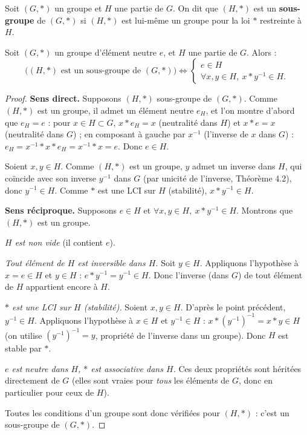 \documentclass[a4paper,12pt,openany]{book}
\begin{document}
\begin{definition}[4.4]
Soit $(G,*)$ un groupe et $H$ une partie de $G$. On dit que $(H,*)$ est un
\textbf{sous-groupe} de $(G,*)$ si $(H,*)$ est lui-même un groupe pour la
loi $*$ restreinte à $H$.
\end{definition}

\begin{theoreme}
Soit $(G,*)$ un groupe d'élément neutre $e$, et $H$ une partie de $G$.
Alors :
\[
\big((H,*) \text{ est un sous-groupe de } (G,*)\big) \iff
\begin{cases}
e \in H \\
\forall x,y \in H,\ x*y^{-1} \in H.
\end{cases}
\]
\end{theoreme}

\begin{proof}
\textbf{Sens direct.} Supposons $(H,*)$ sous-groupe de $(G,*)$. Comme
$(H,*)$ est un groupe, il admet un élément neutre $e_H$, et l'on montre
d'abord que $e_H=e$ : pour $x\in H\subset G$, $x*e_H=x$ (neutralité dans
$H$) et $x*e=x$ (neutralité dans $G$) ; en composant à gauche par
$x^{-1}$ (l'inverse de $x$ dans $G$) : $e_H = x^{-1}*x*e_H = x^{-1}*x =
e$. Donc $e\in H$.

Soient $x,y\in H$. Comme $(H,*)$ est un groupe, $y$ admet un inverse dans
$H$, qui coïncide avec son inverse $y^{-1}$ dans $G$ (par unicité de
l'inverse, Théorème 4.2), donc $y^{-1}\in H$. Comme $*$ est une LCI sur
$H$ (stabilité), $x*y^{-1}\in H$.

\textbf{Sens réciproque.} Supposons $e\in H$ et $\forall x,y\in H,\
x*y^{-1}\in H$. Montrons que $(H,*)$ est un groupe.

\emph{$H$ est non vide} (il contient $e$).

\emph{Tout élément de $H$ est inversible dans $H$.} Soit $y\in H$.
Appliquons l'hypothèse à $x=e\in H$ et $y\in H$ : $e*y^{-1} = y^{-1} \in
H$. Donc l'inverse (dans $G$) de tout élément de $H$ appartient encore à
$H$.

\emph{$*$ est une LCI sur $H$ (stabilité).} Soient $x,y\in H$. D'après le
point précédent, $y^{-1}\in H$. Appliquons l'hypothèse à $x\in H$ et
$y^{-1}\in H$ : $x*(y^{-1})^{-1} = x*y \in H$ (on utilise
$(y^{-1})^{-1}=y$, propriété de l'inverse dans un groupe). Donc $H$ est
stable par $*$.

\emph{$e$ est neutre dans $H$, $*$ est associative dans $H$.} Ces deux
propriétés sont héritées directement de $G$ (elles sont vraies pour
\emph{tous} les éléments de $G$, donc en particulier pour ceux de $H$).

Toutes les conditions d'un groupe sont donc vérifiées pour $(H,*)$ : c'est
un sous-groupe de $(G,*)$.
\end{proof}
\end{document}
